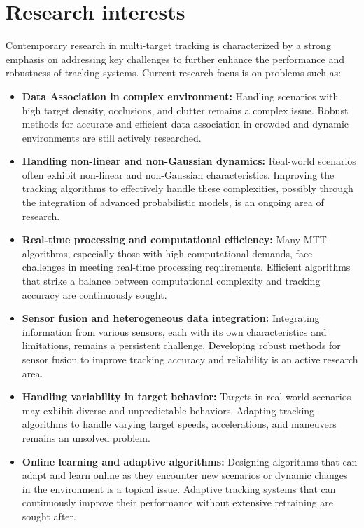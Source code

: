 \section{Research interests}
Contemporary research in multi-target tracking is characterized by a strong emphasis on addressing key challenges to
further enhance the performance and robustness of tracking systems. Current research focus is on problems such as:
\begin{itemize}
  \item \textbf{Data Association in complex environment:}  Handling scenarios with high target density, occlusions, and clutter remains a complex issue. Robust methods for accurate and efficient data association in crowded and dynamic environments are still actively researched.
  \item \textbf{Handling non-linear and non-Gaussian dynamics:}  Real-world scenarios often exhibit non-linear and
  non-Gaussian characteristics. Improving the tracking algorithms to effectively handle these complexities, possibly
  through the integration of advanced probabilistic models, is an ongoing area of research.
  \item \textbf{Real-time processing and computational efficiency:} Many MTT algorithms, especially those with high computational demands, face challenges in meeting real-time processing requirements. Efficient algorithms that strike a balance between computational complexity and tracking accuracy are continuously sought.
  \item \textbf{Sensor fusion and heterogeneous data integration:} Integrating information from various sensors, each
  with its own characteristics and limitations, remains a persistent challenge. Developing robust methods for sensor
  fusion
  to improve tracking accuracy and reliability is an active research area.
  \item \textbf{Handling variability in target behavior:} Targets in real-world scenarios may exhibit diverse and unpredictable behaviors. Adapting tracking algorithms to handle varying target speeds, accelerations, and maneuvers remains an unsolved problem.
  \item \textbf{Online learning and adaptive algorithms:} Designing algorithms that can adapt and learn online as
  they encounter new scenarios or dynamic changes in the environment is a topical issue. Adaptive tracking
  systems that can continuously improve their performance without extensive retraining are sought after.
\end{itemize}

